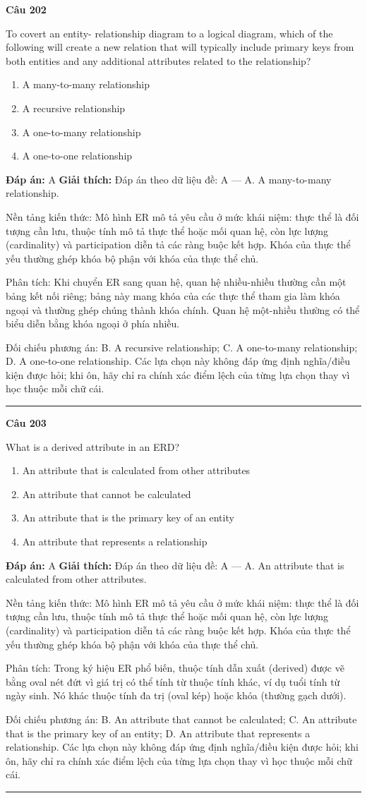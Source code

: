 \documentclass[11pt,a4paper]{article}
\newenvironment{question}[1]{%
  \par\vspace{1em}\noindent\textbf{\large Câu #1}\par\vspace{0.4em}
}{%
  \par\vspace{1em}\hrule\vspace{0.6em}
}
\newenvironment{choices}{%
  \begin{enumerate}[label=\textbf{\Alph*.},leftmargin=2.2em,itemsep=2pt,topsep=3pt]
}{%
  \end{enumerate}
}
\newcommand{\choice}{\item}
\begin{document}
\begin{question}{202}
To covert an entity- relationship diagram to a logical diagram, which of the following will create a new relation that will typically include primary keys from both entities and any additional attributes related to the relationship?
\begin{choices}
\choice A many-to-many relationship
\choice A recursive relationship
\choice A one-to-many relationship
\choice A one-to-one relationship
\end{choices}
\textbf{Đáp án:} A
\textbf{Giải thích:} Đáp án theo dữ liệu đề: A — A. A many-to-many relationship.

Nền tảng kiến thức: Mô hình ER mô tả yêu cầu ở mức khái niệm: thực thể là đối tượng cần lưu, thuộc tính mô tả thực thể hoặc mối quan hệ, còn lực lượng (cardinality) và participation diễn tả các ràng buộc kết hợp. Khóa của thực thể yếu thường ghép khóa bộ phận với khóa của thực thể chủ.

Phân tích: Khi chuyển ER sang quan hệ, quan hệ nhiều-nhiều thường cần một bảng kết nối riêng; bảng này mang khóa của các thực thể tham gia làm khóa ngoại và thường ghép chúng thành khóa chính. Quan hệ một-nhiều thường có thể biểu diễn bằng khóa ngoại ở phía nhiều.

Đối chiếu phương án: B. A recursive relationship; C. A one-to-many relationship; D. A one-to-one relationship. Các lựa chọn này không đáp ứng định nghĩa/điều kiện được hỏi; khi ôn, hãy chỉ ra chính xác điểm lệch của từng lựa chọn thay vì học thuộc mỗi chữ cái.
\end{question}

\begin{question}{203}
What is a derived attribute in an ERD?
\begin{choices}
\choice An attribute that is calculated from other attributes
\choice An attribute that cannot be calculated
\choice An attribute that is the primary key of an entity
\choice An attribute that represents a relationship
\end{choices}
\textbf{Đáp án:} A
\textbf{Giải thích:} Đáp án theo dữ liệu đề: A — A. An attribute that is calculated from other attributes.

Nền tảng kiến thức: Mô hình ER mô tả yêu cầu ở mức khái niệm: thực thể là đối tượng cần lưu, thuộc tính mô tả thực thể hoặc mối quan hệ, còn lực lượng (cardinality) và participation diễn tả các ràng buộc kết hợp. Khóa của thực thể yếu thường ghép khóa bộ phận với khóa của thực thể chủ.

Phân tích: Trong ký hiệu ER phổ biến, thuộc tính dẫn xuất (derived) được vẽ bằng oval nét đứt vì giá trị có thể tính từ thuộc tính khác, ví dụ tuổi tính từ ngày sinh. Nó khác thuộc tính đa trị (oval kép) hoặc khóa (thường gạch dưới).

Đối chiếu phương án: B. An attribute that cannot be calculated; C. An attribute that is the primary key of an entity; D. An attribute that represents a relationship. Các lựa chọn này không đáp ứng định nghĩa/điều kiện được hỏi; khi ôn, hãy chỉ ra chính xác điểm lệch của từng lựa chọn thay vì học thuộc mỗi chữ cái.
\end{question}
\end{document}
